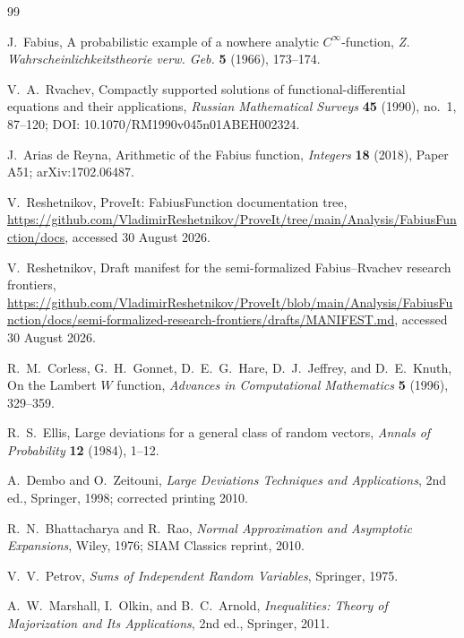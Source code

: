 \documentclass[11pt,a4paper]{article}
\theoremstyle{definition}
\begin{document}
\begin{thebibliography}{99}

J.~Fabius,
\newblock A probabilistic example of a nowhere analytic $C^\infty$-function,
\newblock \emph{Z. Wahrscheinlichkeitstheorie verw. Geb.} \textbf{5}
(1966), 173--174.

V.~A.~Rvachev,
\newblock Compactly supported solutions of functional-differential equations
and their applications,
\newblock \emph{Russian Mathematical Surveys} \textbf{45} (1990), no.~1,
87--120; DOI: 10.1070/RM1990v045n01ABEH002324.

J.~Arias de Reyna,
\newblock Arithmetic of the Fabius function,
\newblock \emph{Integers} \textbf{18} (2018), Paper A51; arXiv:1702.06487.

V.~Reshetnikov,
\newblock ProveIt: FabiusFunction documentation tree,
\newblock \url{https://github.com/VladimirReshetnikov/ProveIt/tree/main/Analysis/FabiusFunction/docs},
accessed 30 August 2026.

V.~Reshetnikov,
\newblock Draft manifest for the semi-formalized Fabius--Rvachev research
frontiers,
\newblock \url{https://github.com/VladimirReshetnikov/ProveIt/blob/main/Analysis/FabiusFunction/docs/semi-formalized-research-frontiers/drafts/MANIFEST.md},
accessed 30 August 2026.

R.~M.~Corless, G.~H.~Gonnet, D.~E.~G.~Hare, D.~J.~Jeffrey, and D.~E.~Knuth,
\newblock On the Lambert $W$ function,
\newblock \emph{Advances in Computational Mathematics} \textbf{5} (1996),
329--359.

R.~S.~Ellis,
\newblock Large deviations for a general class of random vectors,
\newblock \emph{Annals of Probability} \textbf{12} (1984), 1--12.

A.~Dembo and O.~Zeitouni,
\newblock \emph{Large Deviations Techniques and Applications},
\newblock 2nd ed., Springer, 1998; corrected printing 2010.

R.~N.~Bhattacharya and R.~Rao,
\newblock \emph{Normal Approximation and Asymptotic Expansions},
\newblock Wiley, 1976; SIAM Classics reprint, 2010.

V.~V.~Petrov,
\newblock \emph{Sums of Independent Random Variables},
\newblock Springer, 1975.

A.~W.~Marshall, I.~Olkin, and B.~C.~Arnold,
\newblock \emph{Inequalities: Theory of Majorization and Its Applications},
\newblock 2nd ed., Springer, 2011.


\end{thebibliography}
\end{document}
